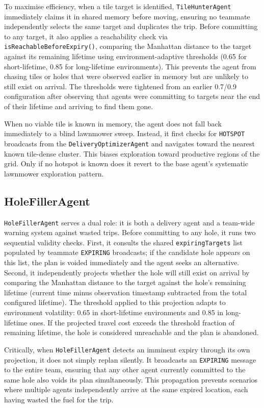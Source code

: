 \documentclass[letterpaper]{article}
\begin{document}
To maximise efficiency, when a tile target is identified, \texttt{TileHunterAgent} immediately claims it
in shared memory before moving, ensuring no teammate independently selects the
same target and duplicates the trip. Before committing to any target, it also
applies a reachability check via \texttt{isReachableBeforeExpiry()}, comparing
the Manhattan distance to the target against its remaining lifetime using
environment-adaptive thresholds (0.65 for short-lifetime, 0.85 for
long-lifetime environments). This prevents the agent from chasing tiles or holes
that were observed earlier in memory but are unlikely to still exist on arrival.
The thresholds were tightened from an earlier 0.7/0.9 configuration after
observing that agents were committing to targets near the end of their lifetime
and arriving to find them gone.

When no viable tile is known in memory, the agent does not fall back immediately
to a blind lawnmower sweep. Instead, it first checks for \texttt{HOTSPOT}
broadcasts from the \texttt{DeliveryOptimizerAgent} and navigates toward the
nearest known tile-dense cluster. This biases exploration toward productive
regions of the grid. Only if no hotspot is known does it revert to the base
agent's systematic lawnmower exploration pattern.

\subsection{HoleFillerAgent}

\texttt{HoleFillerAgent} serves a dual role: it is both a delivery agent and a
team-wide warning system against wasted trips. Before committing to any hole, it
runs two sequential validity checks. First, it consults the shared
\texttt{expiringTargets} list populated by teammate \texttt{EXPIRING} broadcasts;
if the candidate hole appears on this list, the plan is voided immediately and
the agent seeks an alternative. Second, it independently projects whether the
hole will still exist on arrival by comparing the Manhattan distance to the
target against the hole's remaining lifetime (current time minus observation
timestamp subtracted from the total configured lifetime). The threshold applied
to this projection adapts to environment volatility: 0.65 in short-lifetime
environments and 0.85 in long-lifetime ones. If the projected travel cost
exceeds the threshold fraction of remaining lifetime, the hole is considered
unreachable and the plan is abandoned.

Critically, when \texttt{HoleFillerAgent} detects an imminent expiry through its
own projection, it does not simply replan silently. It broadcasts an
\texttt{EXPIRING} message to the entire team, ensuring that any other agent
currently committed to the same hole also voids its plan simultaneously. This
propagation prevents scenarios where multiple agents independently arrive at the
same expired location, each having wasted the fuel for the trip.
\end{document}
